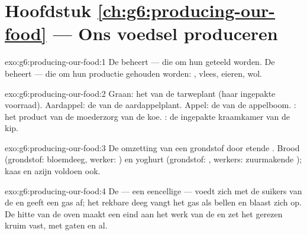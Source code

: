 \section*{Hoofdstuk \ref{ch:g6:producing-our-food} --- Ons voedsel produceren}

\begin{solution}{exo:g6:producing-our-food:1}
De  beheert  ---  die om hun  geteeld worden. De  beheert  ---  die
om hun productie gehouden worden: , vlees, eieren, wol.
\end{solution}

\begin{solution}{exo:g6:producing-our-food:2}
Graan: het  van de tarweplant (haar ingepakte voorraad). Aardappel:
de  van de aardappelplant. Appel: de  van de appelboom. :
het product van de moederzorg van de koe. : de ingepakte kraamkamer van
de kip.
\end{solution}

\begin{solution}{exo:g6:producing-our-food:3}
De omzetting van een grondstof door etende . Brood (grondstof:
bloemdeeg, werker: ) en yoghurt (grondstof: , werkers:
zuurmakende ); kaas en azijn voldoen ook.
\end{solution}

\begin{solution}{exo:g6:producing-our-food:4}
De  --- een eencellige  --- voedt zich met de suikers van de
 en geeft een gas af; het rekbare deeg vangt het gas als bellen en
blaast zich op. De hitte van de oven maakt een eind aan het werk van de
 en zet het gerezen kruim vast, met gaten en al.
\end{solution}

